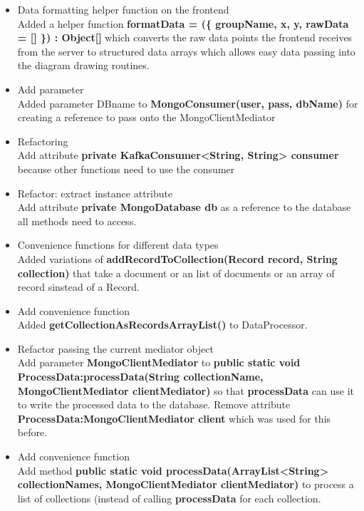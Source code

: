 \documentclass[oneside, english, final]{design}
\begin{document}
\begin{itemize}
\item{Data formatting helper function on the frontend
  \\
  Added a helper function \textsf{\textbf{formatData = (\{ groupName, x, y, rawData = [] \}) : Object[] }} which converts the raw data points the frontend receives from the server to structured data arrays which allows easy data passing into the diagram drawing routines.}
  
\item{Add parameter
  \\
	Added parameter DBname to \textsf{\textbf{MongoConsumer(user, pass, dbName)}} for creating a reference to pass onto the MongoClientMediator}

\item{Refactoring
  \\
  Add attribute \textsf{\textbf{private KafkaConsumer<String, String> consumer}} because other functions need to use the consumer}

  \item{Refactor: extract instance attribute}
    \\ 
    Add attribute \textsf{\textbf{private MongoDatabase db}}
    as a reference to the database all methods need to access.

  \item{Convenience functions for different data types}
    \\
    Added variations of \textsf{\textbf{addRecordToCollection(Record record, String collection)}}
    that take a document or an list of documents or an array of record sinstead of a Record.


  \item{Add convenience function}
    \\
    Added \textsf{\textbf{getCollectionAsRecordsArrayList()}}
    to DataProcessor.

  \item{Refactor passing the current mediator object}
  \\
    Add parameter \textsf{\textbf{MongoClientMediator}} to \textsf{\textbf{public static void ProcessData:processData(String collectionName, MongoClientMediator clientMediator)}} so that \textsf{\textbf{processData}} can use it to write the processed data to the database. Remove attribute \textsf{\textbf{ProcessData:MongoClientMediator client}} which was used for this before.


  \item{Add convenience function}
    \\
    Add method \textsf{\textbf{public static void processData(ArrayList<String> collectionNames, MongoClientMediator clientMediator)}} to process a list of collections (instead of calling \textsf{\textbf{processData}} for each collection.
    

\end{itemize}
\end{document}
